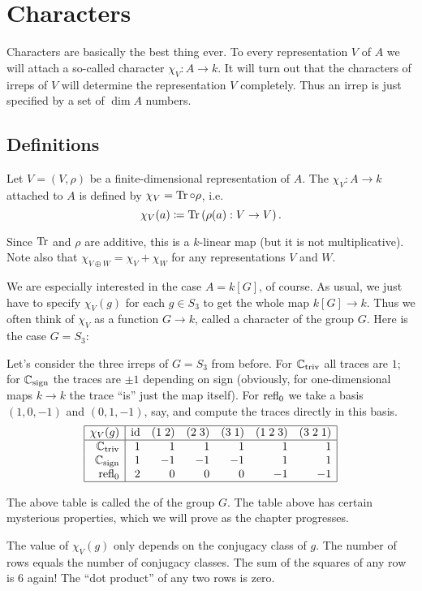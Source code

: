 \chapter{Characters}
Characters are basically the best thing ever.
To every representation $V$ of $A$ we will attach a
so-called character $\chi_V : A \to k$.
It will turn out that the characters of irreps of $V$
will determine the representation $V$ completely.
Thus an irrep is just specified by a set of $\dim A$ numbers.

\section{Definitions}
\begin{definition}
	Let $V = (V, \rho)$ be a finite-dimensional representation of $A$.
	The  $\chi_V : A \to k$ attached to
	$A$ is defined by $\chi_V = \operatorname{Tr} \circ \rho$, i.e.\
	\[ \chi_V(a) \coloneqq \operatorname{Tr}\left( \rho(a) : V \to V \right). \]
\end{definition}
Since $\operatorname{Tr}$ and $\rho$ are additive, this is a $k$-linear map
(but it is not multiplicative).
Note also that $\chi_{V \oplus W} = \chi_V + \chi_W$
for any representations $V$ and $W$.

We are especially interested in the case $A = k[G]$, of course.
As usual, we just have to specify $\chi_V(g)$ for each
$g \in S_3$ to get the whole map $k[G] \to k$.
Thus we often think of $\chi_V$ as a function $G \to k$,
called a character of the group $G$.
Here is the case $G = S_3$:
\begin{example}
	Let's consider the three irreps of $G = S_3$ from before.
	For $\mathbb C_{\text{triv}}$ all traces are $1$;
	for $\mathbb C_{\text{sign}}$ the traces are $\pm 1$ depending on sign
	(obviously, for one-dimensional maps $k \to k$ the trace ``is''
	just the map itself).
	For $\operatorname{refl}_0$ we take a basis $(1,0,-1)$ and $(0,1,-1)$, say,
	and compute the traces directly in this basis.
	\[
		\begin{array}{|r|rrrrrr|}
			\hline
			\chi_V(g) & \mathrm{id} & (1\;2) & (2\;3) & (3\;1)
				& (1\;2\;3) & (3\;2\;1)  \\ \hline
			\mathbb C_{\mathrm{triv}} & 1 & 1 & 1 & 1 & 1 & 1 \\
			\mathbb C_{\mathrm{sign}} & 1 & -1 & -1 & -1 & 1 & 1 \\
			\operatorname{refl}_0 & 2 & 0 & 0 & 0 & -1 & -1 \\ \hline
		\end{array}
	\]
\end{example}
The above table is called the  of the group $G$.
The table above has certain mysterious properties,
which we will prove as the chapter progresses.
\begin{enumerate}[(I)]
	\ii The value of $\chi_V(g)$ only depends on the conjugacy class of $g$.
	\ii The number of rows equals the number of conjugacy classes.
	\ii The sum of the squares of any row is $6$ again!
	\ii The ``dot product'' of any two rows is zero.
\end{enumerate}

